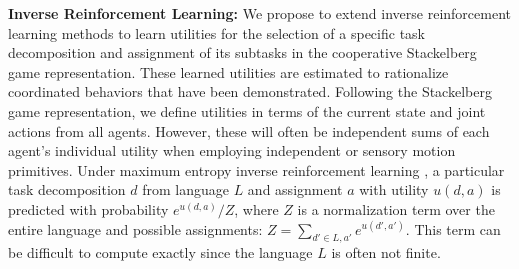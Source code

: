 \documentclass[letterpaper, 11 pt, onecolumn]{article}
\newcommand{\jie}[1]{\textcolor{green}{JF: #1}}
\begin{document}
\noindent 
{\bf Inverse Reinforcement Learning:} We propose to extend inverse reinforcement learning methods \cite{ziebart2008maximum} to learn utilities for the selection of a specific task decomposition and assignment of its subtasks in the cooperative Stackelberg game representation. These learned utilities are estimated to rationalize coordinated behaviors that have been demonstrated.  Following the Stackelberg game representation, we define utilities in terms of the current state and joint actions from all agents. However, these will often be independent sums of each agent's individual utility when employing independent or sensory motion primitives. 
Under maximum entropy inverse reinforcement learning \cite{ziebart2008maximum}, a particular task decomposition $d$  from language $L$ and assignment $a$ with utility $u(d,a)$ is predicted with probability $e^{u(d,a)}/Z$, where $Z$ is a normalization term over the entire language and possible assignments: $Z = \sum_{d' \in L, a'} e^{u(d',a')}$. This term can be difficult to compute exactly since the language $L$ is often not finite.



\end{document}
